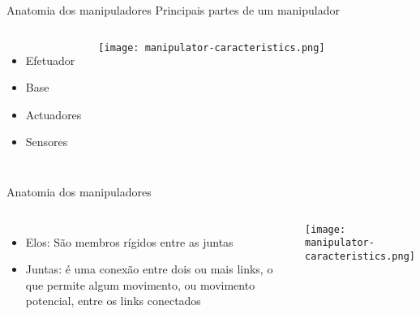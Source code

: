\begin{frame}[c]{} 
   
    \begin{center}
    \end{center}
       
\end{frame}
\begin{frame}[c]{Anatomia dos manipuladores}
    Principais partes de um manipulador
    \vspace*{0.3cm}
    \begin{columns}
        \begin{itemize}
            \item Efetuador
            \item Base 
            \item Actuadores
            \item Sensores  
        \end{itemize}
            \centering
            \texttt{[image: manipulator-caracteristics.png]}
    \end{columns}
\end{frame}
\begin{frame}[c]{Anatomia dos manipuladores}
    \begin{columns}
        \begin{itemize}
            \item Elos: São membros rígidos entre as juntas 
            \item Juntas: é uma conexão entre dois ou mais
            links, o que permite algum movimento, ou movimento
            potencial, entre os links conectados     
        \end{itemize}
            \centering
            \texttt{[image: manipulator-caracteristics.png]}
    \end{columns}
\end{frame}
